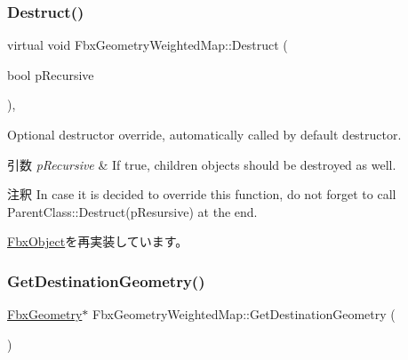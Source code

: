 \mbox{\label{class_fbx_geometry_weighted_map_a638d84bf777db4a17d63505f62d9f22f}} 
\subsubsection{\texorpdfstring{Destruct()}{Destruct()}}
{\footnotesize\ttfamily virtual void Fbx\+Geometry\+Weighted\+Map\+::\+Destruct (\begin{DoxyParamCaption}\item[{bool}]{p\+Recursive }\end{DoxyParamCaption})\hspace{0.3cm}{\ttfamily [protected]}, {\ttfamily [virtual]}}

Optional destructor override, automatically called by default destructor. 
\begin{DoxyParams}{引数}
{\em p\+Recursive} & If true, children objects should be destroyed as well. \\
\hline
\end{DoxyParams}
\begin{DoxyRemark}{注釈}
In case it is decided to override this function, do not forget to call Parent\+Class\+::\+Destruct(p\+Resursive) at the end. 
\end{DoxyRemark}


\hyperlink{class_fbx_object_a123e084d9b32b29c28af6384b7c3c608}{Fbx\+Object}を再実装しています。

\mbox{\label{class_fbx_geometry_weighted_map_ac0d7b29146fd71ceed30e13bf99f2656}} 
\subsubsection{\texorpdfstring{Get\+Destination\+Geometry()}{GetDestinationGeometry()}}
{\footnotesize\ttfamily \hyperlink{class_fbx_geometry}{Fbx\+Geometry}$\ast$ Fbx\+Geometry\+Weighted\+Map\+::\+Get\+Destination\+Geometry (\begin{DoxyParamCaption}{ }\end{DoxyParamCaption})}

